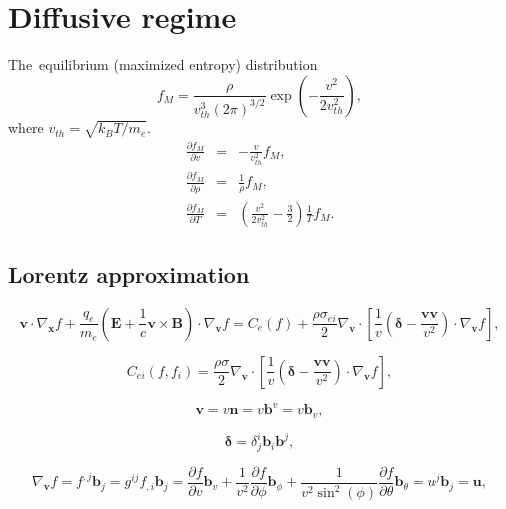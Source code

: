 \documentclass[review]{elsarticle}
\newcommand{\pdv}[2]{\frac{\partial{#1}}{\partial{#2}}}
\newcommand{\vect}[1]{\boldsymbol{#1}}
\newcommand{\matr}[1]{\mathbf{#1}}
\newcommand{\vmag}{v}
\newcommand{\vth}{v_{th}}
\newcommand{\vn}{\vect{n}}
\newcommand{\E}{\vect{E}}
\newcommand{\B}{\vect{B}}
\newcommand{\qe}{q_e}
\newcommand{\me}{m_e}
\newcommand{\kB}{k_B}
\newcommand{\fM}{f_M}
\begin{document}
\section{Diffusive regime}
The~equilibrium (maximized entropy) distribution
\begin{equation}
  \fM = \frac{\rho}{\vth^3 \left( 2 \pi \right)^{3/2}} 
  \exp\left(- \frac{\vmag^2}{2 \vth^2} \right) ,
  \label{eq:MBdistribution}
\end{equation}
where $\vth = \sqrt{\kB T/\me}$.
\begin{eqnarray}
  \pdv{\fM}{\vmag} &=& -\frac{\vmag}{\vth^2}\fM ,
  \nonumber \\
  \pdv{\fM}{\rho} &=& \frac{1}{\rho}\fM ,
  \nonumber \\
  \pdv{\fM}{T} &=& \left( \frac{\vmag^2}{2 \vth^2} - \frac{3}{2}\right)
  \frac{1}{T}\fM. 
  \nonumber
\end{eqnarray}

\subsection{Lorentz approximation}
\begin{equation}
  \vect{v}\cdot\nabla_{\vect{x}} f 
  + \frac{\qe}{\me}\left(\E + \frac{1}{c}\vect{v}\times\B\right)\cdot
  \nabla_{\vect{v}}f = 
  C_e(f)
  + \frac{\rho\sigma_{ei}}{2}\nabla_{\vect{v}}\cdot
  \left[\frac{1}{\vmag}
  \left(\matr{\delta} - \frac{\vect{v}\vect{v}}{\vmag^2} \right)\cdot
  \nabla_{\vect{v}} f\right] ,
  \label{eq:Lorentz}
\end{equation}

\begin{equation}
  C_{ei}(f, f_i) = 
  \frac{\rho\sigma}{2}\nabla_{\vect{v}}\cdot
  \left[\frac{1}{\vmag}
  \left(\matr{\delta} - \frac{\vect{v}\vect{v}}{\vmag^2} \right)\cdot
  \nabla_{\vect{v}} f\right] ,
  \label{eq:ei_collision_operator}
\end{equation}

\begin{equation}
  \vect{v} = \vmag\vn = \vmag\vect{b}^\vmag = \vmag\vect{b}_\vmag ,
  \label{eq:v}
\end{equation}

\begin{equation}
  \matr{\delta} = \delta^i_j \vect{b}_i \vect{b}^j ,
  \label{eq:delta}
\end{equation}

\begin{equation}
  \nabla_{\vect{v}} f = f^{,j}\vect{b}_j = g^{ij} f_{,i}\vect{b}_j 
  = \pdv{f}{\vmag}\vect{b}_\vmag + \frac{1}{\vmag^2}\pdv{f}{\phi}\vect{b}_\phi
  + \frac{1}{\vmag^2\sin^2(\phi)}\pdv{f}{\theta}\vect{b}_{\theta} 
  = u^j\vect{b}_j = \vect{u} ,
  \nonumber
\end{equation}
\end{document}
